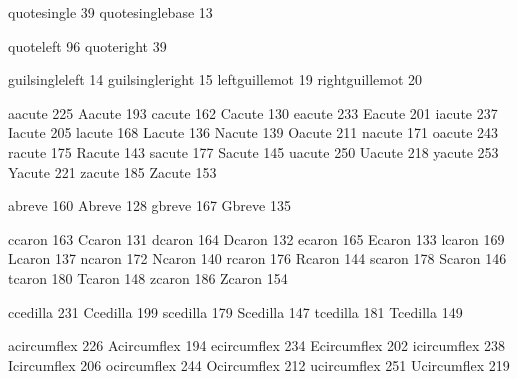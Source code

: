  quotesingle      39 %
 quotesinglebase  13

 quoteleft        96
 quoteright       39

 guilsingleleft   14
 guilsingleright  15
 leftguillemot    19
 rightguillemot   20

 aacute          225
 Aacute          193
 cacute          162
 Cacute          130
 eacute          233
 Eacute          201
 iacute          237
 Iacute          205
 lacute          168
 Lacute          136
 Nacute          139
 Oacute          211
 nacute          171
 oacute          243
 racute          175
 Racute          143
 sacute          177
 Sacute          145
 uacute          250
 Uacute          218
 yacute          253
 Yacute          221
 zacute          185
 Zacute          153

 abreve          160
 Abreve          128
 gbreve          167
 Gbreve          135

 ccaron          163
 Ccaron          131
 dcaron          164
 Dcaron          132
 ecaron          165
 Ecaron          133
 lcaron          169
 Lcaron          137
 ncaron          172
 Ncaron          140
 rcaron          176
 Rcaron          144
 scaron          178
 Scaron          146
 tcaron          180
 Tcaron          148
 zcaron          186
 Zcaron          154

 ccedilla        231
 Ccedilla        199
 scedilla        179
 Scedilla        147
 tcedilla        181
 Tcedilla        149

 acircumflex     226
 Acircumflex     194
 ecircumflex     234
 Ecircumflex     202
 icircumflex     238
 Icircumflex     206
 ocircumflex     244
 Ocircumflex     212
 ucircumflex     251
 Ucircumflex     219

